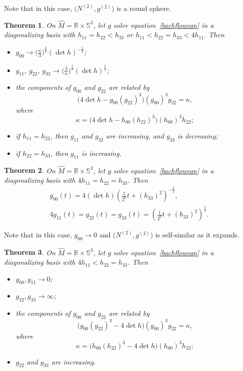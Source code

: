 \documentclass[pdftex]{sigma}
\numberwithin{equation}{section}
\newtheorem{Theorem}{Theorem}[section]
\begin{document}
Note that in this case, $\big(N^{(2)}, g^{(2)}\big)$ is a round sphere.

\begin{Theorem} \label{s3bdythm2} On $\widehat{M} = \mathbb{R} \times \mathbb{S}^3$, let $g$ solve equation~\eqref{bachfloweqn} in a diagonalizing basis with $h_{11} = h_{22} < h_{33}$ or $h_{11} < h_{22} = h_{33} < 4 h_{11}$. Then
\begin{itemize}\itemsep=0pt
\item $g_{00} \rightarrow \big(\frac{\kappa}{3} \big)^{\frac{3}{8}} (\det h)^{-\frac{1}{2}}$;
\item $g_{11}$, $g_{22}$, $g_{33} \rightarrow \big(\frac{3}{\kappa} \big)^{\frac{1}{8}} (\det h)^{\frac{1}{2}}$;
\item the components of $g_{00}$ and $g_{22}$ are related by
\[
\big(4 \det h - g_{00} (g_{22})^3\big) (g_{00})^3g_{22} = \kappa,
\]
where
\[
\kappa = \big(4 \det h - h_{00} (h_{22})^3\big) (h_{00})^3 h_{22};
\]
\item if $h_{11} = h_{22}$, then $g_{11}$ and $g_{22}$ are increasing, and $g_{33}$ is decreasing;
\item if $h_{22} = h_{33}$, then $g_{11}$ is increasing.
\end{itemize}
\end{Theorem}

\begin{Theorem} \label{s3bdythm3}
On $\widehat{M} = \mathbb{R} \times \mathbb{S}^3$, let $g$ solve equation~\eqref{bachfloweqn} in a diagonalizing basis with $4h_{11} = h_{22} = h_{33}$. Then
\begin{gather*}
g_{00}(t) = 4 (\det h) \left(\frac{1}{2^6} t + (h_{33})^2\right)^{-\frac{3}{2}}, \\
4 g_{11}(t) = g_{22}(t) = g_{33}(t) = \left(\frac{1}{2^6} t + (h_{33})^2 \right)^{\frac{1}{2}}.
\end{gather*}
\end{Theorem}

Note that in this case, $g_{00} \rightarrow 0$ and $\big(N^{(2)}, g^{(2)}\big)$ is self-similar as it expands.

\begin{Theorem} \label{s3bdythm4}
On $\widehat{M} = \mathbb{R} \times \mathbb{S}^3$, let $g$ solve equation~\eqref{bachfloweqn} in a diagonalizing basis with $4h_{11} < h_{22} = h_{33}$. Then
\begin{itemize}\itemsep=0pt
\item $g_{00}, g_{11} \rightarrow 0$;
\item $g_{22}, g_{33} \rightarrow \infty$;
\item the components of $g_{00}$ and $g_{22}$ are related by
\[
\big(g_{00} (g_{22})^3 - 4 \det h\big) (g_{00})^3 g_{22} = \kappa,
\]
where
\[
\kappa = \big(h_{00} (h_{22})^3 - 4 \det h\big) (h_{00})^3 h_{22};
\]
\item $g_{22}$ and $g_{33}$ are increasing.
\end{itemize}
\end{Theorem}
\end{document}
